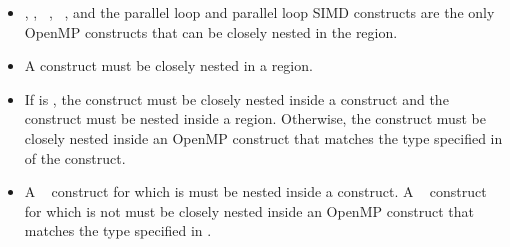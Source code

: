 \begin{itemize}
\item {}, , ~, ~, and 
the parallel loop and parallel loop SIMD constructs are the only OpenMP constructs 
that can be closely nested in the  region. 

\item A  construct must be closely nested in a  region. 

\item If  is , the  construct must be closely 
nested inside a  construct and the  construct must be nested inside a 
 region. Otherwise, the  construct must be closely nested inside 
an OpenMP construct that matches the type specified in  of the 
 construct. 

\item A ~ construct for which  is 
 must be nested inside a  construct. A ~ 
construct for which  is not  must be closely nested 
inside an OpenMP construct that matches the type specified in . 
\end{itemize}


